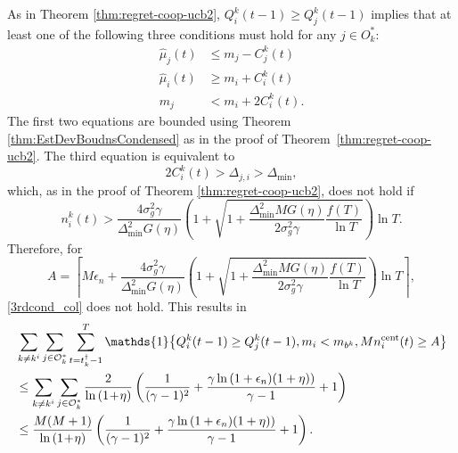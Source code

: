 \documentclass[final,5p,times,twocolumn]{elsarticle}
\theoremstyle{definition}
\newcommand{\lnn}[1]{%
	\ln  \left(#1\right)%
}
\begin{document}
	
	As in Theorem \ref{thm:regret-coop-ucb2}, $Q_i^k(t-1) \geq Q_j^k(t-1)$ implies that at least one of the following three conditions must hold for any $j \in O^*_{k}$:
	\begin{align}
		\hat{\mu}_{j}(t) &\leq m_{j} - C_{j}^k(t) \label{1stcond_col} \\
		\hat{\mu}_{i}(t) &\geq m_{i} + C_{i}^k(t) \label{2ndcond_col} \\
		m_{j} &< m_{i} + 2 C_{i}^k(t). \label{3rdcond_col} 
	\end{align}
	The first two equations are bounded using Theorem \ref{thm:EstDevBoudnsCondensed} as in the proof of Theorem~\ref{thm:regret-coop-ucb2}.  The third equation is equivalent to 
	\begin{equation*}
		2 C_i^k(t) > \Delta_{j,i} > \Delta_{\text{min}},
	\end{equation*}
	which, as in the proof of Theorem \ref{thm:regret-coop-ucb2}, does not hold if
	\begin{equation*}
		n_i^k(t) >   \frac{4 \sigma_g^2 \gamma  }{\Delta_{\min}^2 G(\eta)} \left( 1 + \sqrt{1  + \frac{\Delta_{\min}^2 MG(\eta)}{2 \sigma_g^2 \gamma} \frac{f(T)}{\ln T}} \right)  \ln T.
	\end{equation*}
	Therefore, for
	\begin{equation*}
		A  =  \left \lceil  M \epsilon_n  +  \frac{4 \sigma_g^2 \gamma  }{\Delta_{\min}^2 G(\eta)}  \left( 1 + \sqrt{1  +  \frac{\Delta_{\min}^2 MG(\eta)}{2 \sigma_g^2 \gamma} \frac{f(T)}{\ln T}} \right)  \ln T \right \rceil,
	\end{equation*}
	\eqref{3rdcond_col} does not hold.
	This results in 
	\begin{align}
			& \sum_{k \neq k^i}   \sum_{j \in \mathcal{O}_{k}^*} \sum_{t=t_k^\dag -1 }^{T} \mathds{1} \big\{ Q_i^k(t-1) \geq Q_j^k(t-1),  m_i < m_{b^k}, Mn_i^{\text{cent}}(t) \geq A \big\} \nonumber \\
			& \leq  \sum_{k \neq k^i}   \sum_{j \in \mathcal{O}_{k}^*}  \frac{2}{\lnn{1\!+\!\eta}}   \left( \frac{1}{(\gamma - 1)^2} +  {\frac{\gamma \lnn{1 + \epsilon_n)(1 + \eta)}}{\gamma - 1} +1} \right) \nonumber \\
				& \leq  \frac{M(M+1)}{\lnn{1\!+\!\eta}}   \left( \frac{1}{(\gamma - 1)^2} +  {\frac{\gamma \lnn{1 + \epsilon_n)(1 + \eta)}}{\gamma - 1} +1} \right). \label{eqn:Collisions_Selections_P1} 
	\end{align}
\end{document}
